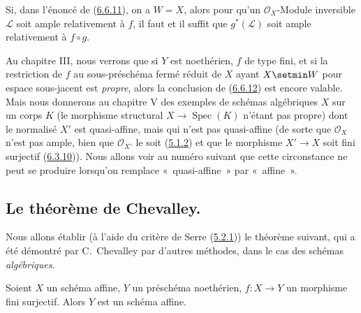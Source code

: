 \begin{corollary}[6.6.12]
\label{II.6.6.12-fr}
Si, dans l'énoncé de \textup{(\hyperref[II.6.6.11-fr]{6.6.11})}, on a $W=X$, alors
pour qu'un $\mathcal{O}_X$-Module inversible $\mathcal{L}$ soit ample
relativement à $f$, il faut et il suffit que $g^*(\mathcal{L})$ soit ample
relativement à $f\circ g$.
\end{corollary}

\begin{remark}[6.6.13]
\label{II.6.6.13-fr}
Au chapitre III, nous verrons que si $Y$ est noethérien, $f$ de type fini, et
si la restriction de $f$ au sous-préschéma fermé réduit de $X$ ayant $X\setmin W$
pour espace sous-jacent est \emph{propre}, alors la conclusion de
(\hyperref[II.6.6.12-fr]{6.6.12}) est encore valable. Mais nous donnerons au
chapitre V des exemples de schémas algébriques $X$ sur un corps $K$ (le
morphisme structural $X\to\operatorname{Spec}(K)$ n'étant pas propre) dont
le normalisé $X'$ est quasi-affine, mais qui n'est pas quasi-affine (de sorte
que $\mathcal{O}_X$ n'est pas ample, bien que $\mathcal{O}_{X'}$ le soit
(\hyperref[II.5.1.2-fr]{5.1.2}) et que le morphisme $X'\to X$ soit fini
surjectif (\hyperref[II.6.3.10-fr]{6.3.10})). Nous allons voir au numéro
suivant que cette circonstance ne peut se produire lorsqu'on remplace
«~quasi-affine~» par «~affine~».
\end{remark}

\subsection{Le théorème de Chevalley.}
\label{subsection:II.6.7-fr}

Nous allons établir (à l'aide du critère de Serre
(\hyperref[II.5.2.1-fr]{5.2.1})) le théorème suivant, qui a été démontré par
C.~Chevalley par d'autres méthodes, dans le cas des schémas
\emph{algébriques}.


\begin{theorem}[6.7.1]
\label{II.6.7.1-fr}
Soient $X$ un schéma affine, $Y$ un préschéma noethérien, $f:X\to Y$ un
morphisme fini surjectif. Alors $Y$ est un schéma affine.
\end{theorem}

